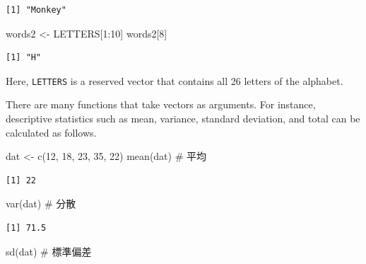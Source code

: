 \documentclass[
  a4paper,
]{book}
\newenvironment{Shaded}{\begin{snugshade}}{\end{snugshade}}
\newcommand{\CommentTok}[1]{\textcolor[rgb]{0.37,0.37,0.37}{#1}}
\newcommand{\DecValTok}[1]{\textcolor[rgb]{0.68,0.00,0.00}{#1}}
\newcommand{\FunctionTok}[1]{\textcolor[rgb]{0.28,0.35,0.67}{#1}}
\newcommand{\NormalTok}[1]{\textcolor[rgb]{0.00,0.23,0.31}{#1}}
\newcommand{\OtherTok}[1]{\textcolor[rgb]{0.00,0.23,0.31}{#1}}
\newcommand{\SpecialCharTok}[1]{\textcolor[rgb]{0.37,0.37,0.37}{#1}}
\begin{document}
\begin{verbatim}
[1] "Monkey"
\end{verbatim}

\begin{Shaded}
\begin{Highlighting}[]
\NormalTok{words2 }\OtherTok{\textless{}{-}}\NormalTok{ LETTERS[}\DecValTok{1}\SpecialCharTok{:}\DecValTok{10}\NormalTok{]}
\NormalTok{words2[}\DecValTok{8}\NormalTok{]}
\end{Highlighting}
\end{Shaded}

\begin{verbatim}
[1] "H"
\end{verbatim}

Here, \texttt{LETTERS} is a reserved vector that contains all 26 letters
of the alphabet.

There are many functions that take vectors as arguments. For instance,
descriptive statistics such as mean, variance, standard deviation, and
total can be calculated as follows.

\begin{Shaded}
\begin{Highlighting}[]
\NormalTok{dat }\OtherTok{\textless{}{-}} \FunctionTok{c}\NormalTok{(}\DecValTok{12}\NormalTok{, }\DecValTok{18}\NormalTok{, }\DecValTok{23}\NormalTok{, }\DecValTok{35}\NormalTok{, }\DecValTok{22}\NormalTok{)}
\FunctionTok{mean}\NormalTok{(dat) }\CommentTok{\# 平均}
\end{Highlighting}
\end{Shaded}

\begin{verbatim}
[1] 22
\end{verbatim}

\begin{Shaded}
\begin{Highlighting}[]
\FunctionTok{var}\NormalTok{(dat) }\CommentTok{\# 分散}
\end{Highlighting}
\end{Shaded}

\begin{verbatim}
[1] 71.5
\end{verbatim}

\begin{Shaded}
\begin{Highlighting}[]
\FunctionTok{sd}\NormalTok{(dat) }\CommentTok{\# 標準偏差}
\end{Highlighting}
\end{Shaded}
\end{document}
